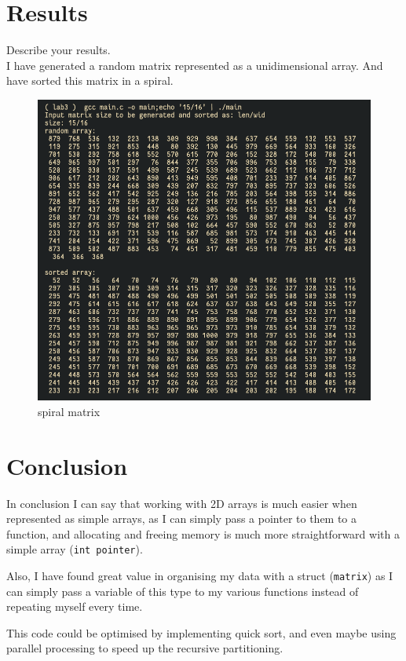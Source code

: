 \documentclass[12pt]{article}
\begin{document}
\pagebreak

\section*{Results}
\hspace{0.8cm}
Describe your results.\\

I have generated a random matrix represented as a unidimensional array.
And have sorted this matrix in a spiral.
\begin{figure}[!h]
  \centering
  \includegraphics[width=\textwidth]{spiral_matrix.png}
  \caption{spiral matrix}
\end{figure}

\pagebreak

\section*{Conclusion}
In conclusion I can say that working with 2D arrays is much easier when represented as simple arrays, as I can simply pass a pointer to them to a function, and allocating and freeing memory is much more straightforward with a simple array (\texttt{int pointer}).

Also, I have found great value in organising my data with a struct (\texttt{matrix}) as I can simply pass a variable of this type to my various functions instead of repeating myself every time.

This code could be optimised by implementing quick sort, and even maybe using parallel processing to speed up the recursive partitioning.

\pagebreak

\printbibliography
\end{document}
